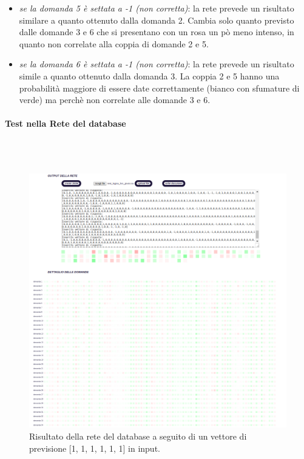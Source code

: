 \begin{itemize}
\begin{itemize}
\item \textit{se la domanda 5 \`e settata a -1 (non corretta)}: la rete prevede un risultato similare a quanto ottenuto dalla domanda 2. Cambia solo quanto previsto dalle domande 3 e 6 che si presentano con un rosa un p\`o meno intenso, in quanto non  correlate alla coppia di domande 2 e 5.
\item \textit{se la domanda 6 \`e settata a -1 (non corretta)}: la rete prevede un risultato simile a quanto ottenuto dalla domanda 3. La coppia 2 e 5 hanno una probabilit\`a maggiore di essere date correttamente (bianco con sfumature di verde) ma perch\`e non correlate alle domande 3 e 6.
\end{itemize}
\end{itemize}

\paragraph{Test nella Rete del database}\mbox{}\\\\
\label{Test nella Rete del database}
\noindent

\begin{figure}[H]
\centering
	\includegraphics[width=0.90\linewidth]{./image/rete_db-vp1.png}
	\caption{Risultato della rete del database a seguito di un vettore di previsione [1, 1, 1, 1, 1, 1] in input.}
\end{figure}

